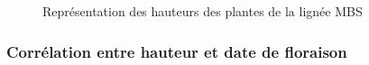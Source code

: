 \documentclass[12pt,a4paper]{article}
\begin{document}
				\begin{figure} %
					\begin{minipage}[t]{0.32\textwidth}
					\end{minipage}
					\begin{minipage}[t]{0.32\textwidth}
					\end{minipage}
					\begin{minipage}[t]{0.32\textwidth}
					\end{minipage}
					\caption{Représentation des hauteurs des plantes de la lignée MBS \label{hauteursmbs}}
				\end{figure}

			\subsubsection{Corrélation entre hauteur et date de floraison}
				
\end{document}
